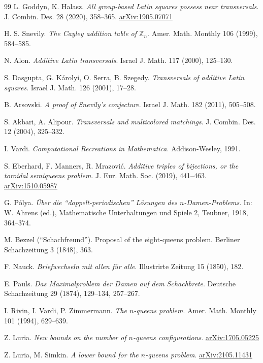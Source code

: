 \begin{thebibliography}{99}
 L. Goddyn, K. Halasz. \emph{All group-based Latin squares possess near transversals}. J. Combin. Des. 28 (2020), 358--365. \href{https://arxiv.org/abs/1905.07071}{arXiv:1905.07071}

 H. S. Snevily. \emph{The Cayley addition table of $\mathbb Z_n$}. Amer. Math. Monthly 106 (1999), 584--585.

 N. Alon. \emph{Additive Latin transversals}. Israel J. Math. 117 (2000), 125--130.

 S. Dasgupta, G. K\'arolyi, O. Serra, B. Szegedy. \emph{Transversals of additive Latin squares}. Israel J. Math. 126 (2001), 17--28.

 B. Arsovski. \emph{A proof of Snevily's conjecture}. Israel J. Math. 182 (2011), 505--508.

 S. Akbari, A. Alipour. \emph{Transversals and multicolored matchings}. J. Combin. Des. 12 (2004), 325--332.

 I. Vardi. \emph{Computational Recreations in Mathematica}. Addison-Wesley, 1991.

 S. Eberhard, F. Manners, R. Mrazovi\'c. \emph{Additive triples of bijections, or the toroidal semiqueens problem}. J. Eur. Math. Soc. (2019), 441--463. \href{https://arxiv.org/abs/1510.05987}{arXiv:1510.05987}

 G. P\'olya. \emph{\"Uber die ``doppelt-periodischen'' L\"osungen des $n$-Damen-Problems}. In: W. Ahrens (ed.), Mathematische Unterhaltungen und Spiele 2, Teubner, 1918, 364--374.

 M. Bezzel (``Schachfreund''). Proposal of the eight-queens problem. Berliner Schachzeitung 3 (1848), 363.

 F. Nauck. \emph{Briefwechseln mit allen f\"ur alle}. Illustrirte Zeitung 15 (1850), 182.

 E. Pauls. \emph{Das Maximalproblem der Damen auf dem Schachbrete}. Deutsche Schachzeitung 29 (1874), 129--134, 257--267.

 I. Rivin, I. Vardi, P. Zimmermann. \emph{The $n$-queens problem}. Amer. Math. Monthly 101 (1994), 629--639.

 Z. Luria. \emph{New bounds on the number of $n$-queens configurations}. \href{https://arxiv.org/abs/1705.05225}{arXiv:1705.05225}

 Z. Luria, M. Simkin. \emph{A lower bound for the $n$-queens problem}. \href{https://arxiv.org/abs/2105.11431}{arXiv:2105.11431}


\end{thebibliography}
